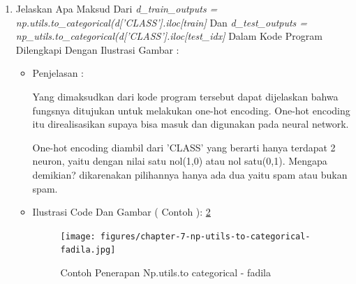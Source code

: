 \begin{enumerate}
\begin{itemize}
\begin{itemize}
\par
\item Contoh 2 :

\par
\par
\begin{figure}[!hbtp]
\centering
\texttt{[image: figures/chapter-7-np-absolute-fadila.jpg]}
\caption{Contoh Penerapan Np Absolute- fadila}
\label{chapter-7-np-absolute-fadila}
\end{figure}
\par
\end{itemize}
\end{itemize}
\par
\par
\item Jelaskan Apa Maksud Dari \emph{d\_train\_outputs = np.utils.to\_categorical(d['CLASS'].iloc[train]} Dan \emph{d\_test\_outputs = np\_utils.to\_categorical(d['CLASS'].iloc[test\_idx]} Dalam Kode Program Dilengkapi Dengan Ilustrasi Gambar :
\begin{itemize}
\item Penjelasan : 
\par Yang dimaksudkan dari kode program tersebut dapat dijelaskan bahwa fungsnya ditujukan untuk melakukan one-hot encoding. One-hot encoding itu direalisasikan supaya bisa masuk dan digunakan pada neural network. 
\par One-hot encoding diambil dari 'CLASS' yang berarti hanya terdapat 2 neuron, yaitu dengan nilai satu nol(1,0) atau nol satu(0,1). Mengapa demikian? dikarenakan pilihannya hanya ada dua yaitu spam atau bukan spam.
\par
\par
\item Ilustrasi Code Dan Gambar	( Contoh ): \ref{chapter-7-np-utils-to-categorical-fadila}

\par
\begin{figure}[!hbtp]
\centering
\texttt{[image: figures/chapter-7-np-utils-to-categorical-fadila.jpg]}
\caption{Contoh Penerapan Np.utils.to categorical - fadila}
\label{chapter-7-np-utils-to-categorical-fadila}
\end{figure}
\par
\par
\end{itemize}
\par
\par

\end{enumerate}
